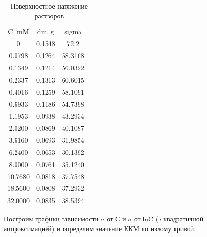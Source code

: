 \documentclass[a4paper, 12pt]{article}
\begin{document}
\begin{table}[h]
\begin{center}
\caption{Поверхностное натяжение растворов}
\begin{tabular}{|c|c|c|c|}
\\ \cline{1-3}
C, mM   & dm, g  & sigma   &  \\ \cline{1-3}
0       & 0.1548 & 72.2    &  \\ \cline{1-3}
0.0798  & 0.1264 & 58.3168 &  \\ \cline{1-3}
0.1349  & 0.1214 & 56.0322 &  \\ \cline{1-3}
0.2337  & 0.1313 & 60.6015 &  \\ \cline{1-3}
0.4016  & 0.1259 & 58.1091 &  \\ \cline{1-3}
0.6933  & 0.1186 & 54.7398 &  \\ \cline{1-3}
1.1953  & 0.0938 & 43.2934 &  \\ \cline{1-3}
2.0200  & 0.0869 & 40.1087 &  \\ \cline{1-3}
3.6160  & 0.0693 & 31.9854 &  \\ \cline{1-3}
6.2400  & 0.0653 & 30.1392 &  \\ \cline{1-3}
8.0000  & 0.0761 & 35.1240 &  \\ \cline{1-3}
10.7680 & 0.0818 & 37.7548 &  \\ \cline{1-3}
18.5600 & 0.0808 & 37.2932 &  \\ \cline{1-3}
32.0000 & 0.0835 & 38.5394 &  \\ \cline{1-3}
\end{tabular}
\end{center}
\end{table}

Построим графики зависимости $\sigma$ от С и $\sigma$ от lnC (c квадратичной аппроксимацией)  и определим значение ККМ по излому кривой.
\end{document}
